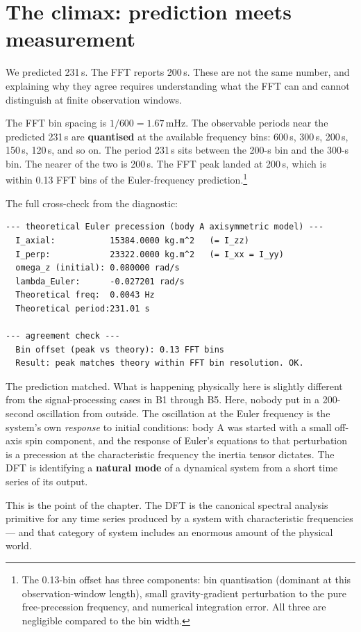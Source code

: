 \documentclass[11pt,a4paper,openany]{book}
\begin{document}
\section{The climax: prediction meets measurement}

We predicted 231\,s. The FFT reports 200\,s. These are not the same number,
and explaining why they agree requires understanding what the FFT can and
cannot distinguish at finite observation windows.

The FFT bin spacing is $1/600 = 1.67$\,mHz. The observable periods near the
predicted 231\,s are \textbf{quantised} at the available frequency bins: 600\,s,
300\,s, 200\,s, 150\,s, 120\,s, and so on. The period 231\,s sits between the
200-s bin and the 300-s bin. The nearer of the two is 200\,s. The FFT peak
landed at 200\,s, which is within 0.13 FFT bins of the Euler-frequency
prediction.\footnote{The 0.13-bin offset has three components: bin quantisation
(dominant at this observation-window length), small gravity-gradient
perturbation to the pure free-precession frequency, and numerical integration
error. All three are negligible compared to the bin width.}

The full cross-check from the diagnostic:
\begin{lstlisting}[style=shaddata]
--- theoretical Euler precession (body A axisymmetric model) ---
  I_axial:           15384.0000 kg.m^2   (= I_zz)
  I_perp:            23322.0000 kg.m^2   (= I_xx = I_yy)
  omega_z (initial): 0.080000 rad/s
  lambda_Euler:      -0.027201 rad/s
  Theoretical freq:  0.0043 Hz
  Theoretical period:231.01 s

--- agreement check ---
  Bin offset (peak vs theory): 0.13 FFT bins
  Result: peak matches theory within FFT bin resolution. OK.
\end{lstlisting}

The prediction matched. What is happening physically here is slightly different
from the signal-processing cases in B1 through B5. Here, nobody put in a
200-second oscillation from outside. The oscillation at the Euler frequency is
the system's own \emph{response} to initial conditions: body A was started with
a small off-axis spin component, and the response of Euler's equations to that
perturbation is a precession at the characteristic frequency the inertia tensor
dictates. The DFT is identifying a \textbf{natural mode} of a dynamical system
from a short time series of its output.

This is the point of the chapter. The DFT is the canonical spectral analysis
primitive for any time series produced by a system with characteristic
frequencies --- and that category of system includes an enormous amount of the
physical world.
\end{document}
